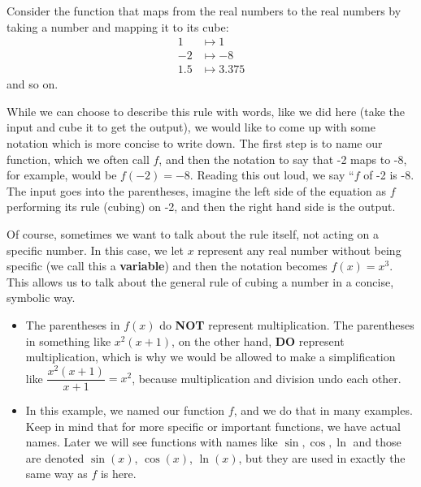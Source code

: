 \documentclass{ximera}
\begin{document}
\begin{example}
Consider the function that maps from the real numbers to the real
numbers by taking a number and mapping it to its cube:
\begin{align*}
1 &\mapsto 1\\
-2 &\mapsto -8\\
1.5 &\mapsto 3.375
\end{align*}
and so on. 

While we can choose to describe this rule with words, like we did here (take the input and cube it to get the output), we would like to come up with some notation which is more concise to write down. The first step is to name our function, which we often call $f$, and then the notation to say that -2 maps to -8, for example, would be $f(-2)=-8$. Reading this out loud, we say ``$f$ of -2 is -8. The input goes into the parentheses, imagine the left side of the equation as $f$ performing its rule (cubing) on -2, and then the right hand side is the output.

Of course, sometimes we want to talk about the rule itself, not acting on a specific number. In this case, we let $x$ represent any real number without being specific (we call this a \textbf{variable}) and then the notation becomes $f(x)=x^3$. This allows us to talk about the general rule of cubing a number in a concise, symbolic way.

\end{example}

\begin{warning}
\begin{itemize}
\item The parentheses in $f(x)$ do \textbf{NOT} represent multiplication. The parentheses in something like $x^2(x+1)$, on the other hand, \textbf{DO} represent multiplication, which is why we would be allowed to make a simplification like $\dfrac{x^2(x+1)}{x+1} = x^2$, because multiplication and division undo each other.
\item In this example, we named our function $f$, and we do that in many examples. Keep in mind that for more specific or important functions, we have actual names. Later we will see functions with names like $\sin, \cos, \ln$ and those are denoted $\sin(x)$, $\cos(x)$, $\ln(x)$, but they are used in exactly the same way as $f$ is here.
\end{itemize}
\end{warning}
\end{document}

